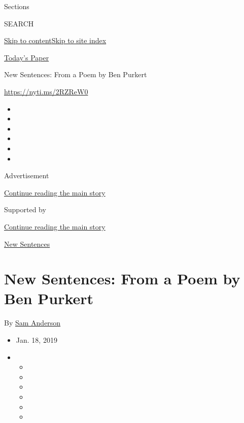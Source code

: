 Sections

SEARCH

\protect\hyperlink{site-content}{Skip to
content}\protect\hyperlink{site-index}{Skip to site index}

\href{https://myaccount.nytimes3xbfgragh.onion/auth/login?response_type=cookie\&client_id=vi}{}

\href{https://www.nytimes3xbfgragh.onion/section/todayspaper}{Today's
Paper}

New Sentences: From a Poem by Ben Purkert

\url{https://nyti.ms/2RZReW0}

\begin{itemize}
\item
\item
\item
\item
\item
\item
\end{itemize}

Advertisement

\protect\hyperlink{after-top}{Continue reading the main story}

Supported by

\protect\hyperlink{after-sponsor}{Continue reading the main story}

\href{/column/new-sentences}{New Sentences}

\hypertarget{new-sentences-from-a-poem-by-ben-purkert}{%
\section{New Sentences: From a Poem by Ben
Purkert}\label{new-sentences-from-a-poem-by-ben-purkert}}

By \href{https://www.nytimes3xbfgragh.onion/by/sam-anderson}{Sam
Anderson}

\begin{itemize}
\item
  Jan. 18, 2019
\item
  \begin{itemize}
  \item
  \item
  \item
  \item
  \item
  \item
  \end{itemize}
\end{itemize}

